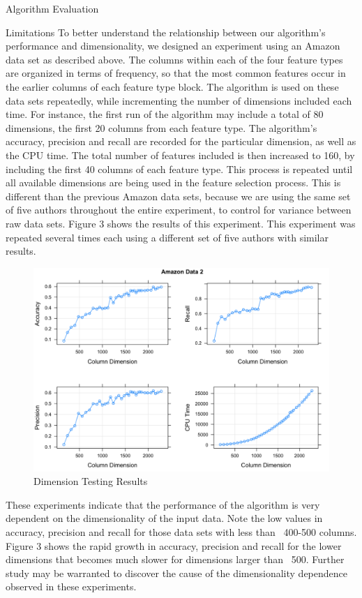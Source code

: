 \documentclass{llncs}
\begin{document}
\begin{section}{Algorithm Evaluation}
\begin{subsection}{Limitations}
To better understand the relationship between our algorithm's performance and dimensionality, we designed an experiment using an Amazon data set as described above. The columns within each of the four feature types are organized in terms of frequency, so that the most common features occur in the earlier columns of each feature type block. The algorithm is used on these data sets repeatedly, while incrementing the number of dimensions included each time. For instance, the first run of the algorithm may include a total of 80 dimensions, the first 20 columns from each feature type. The algorithm's accuracy, precision and recall are recorded for the particular dimension, as well as the CPU time. The total number of features included is then increased to 160, by including the first 40 columns of each feature type. This process is repeated until all available dimensions are being used in the feature selection process. This is different than the previous Amazon data sets, because we are using the same set of five authors throughout the entire experiment, to control for variance between raw data sets. Figure 3 shows the results of this experiment. This experiment was repeated several times each using a different set of five authors with similar results.
\begin{figure}[h]
\begin{center}
\includegraphics[scale = .3]{figures/amazon2}
\caption{Dimension Testing Results}
\end{center}
\label{fig:dimtests}
\end{figure}

These experiments indicate that the performance of the algorithm is very dependent on the dimensionality of the input data. Note the low values in accuracy, precision and recall for those data sets with less than ~400-500 columns. Figure 3 shows the rapid growth in accuracy, precision and recall for the lower dimensions that  becomes much slower for dimensions larger than ~500. Further study may be warranted to discover the cause of the dimensionality dependence observed in these experiments.



\end{subsection}
\end{section}
\end{document}
